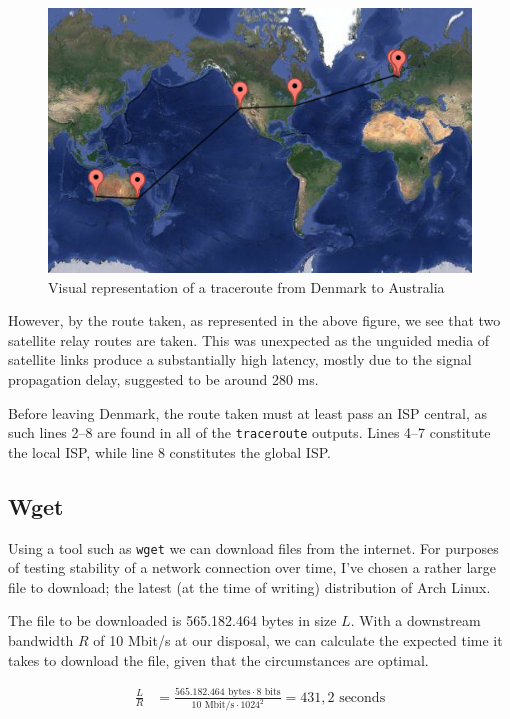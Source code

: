 \documentclass{acm_proc_article-sp}
\newcommand{\prog}[1]{{\tt #1}}
\begin{document}
\begin{figure}[H]
    \center
    \includegraphics[scale=0.47]{figures/traceroute_au.jpg}
    \caption{Visual representation of a traceroute from Denmark to Australia}
    \label{fig:traceroute-australia}
\end{figure}

However, by the route taken, as represented in the above figure, we see that
two satellite relay routes are taken. This was unexpected as the unguided
media of satellite links produce a substantially high latency, mostly due to
the signal propagation delay, suggested\cite[p. 21]{KR} to be around 280 ms.

Before leaving Denmark, the route taken must at least pass an ISP central, as
such lines 2--8 are found in all of the \prog{traceroute} outputs. Lines 4--7
constitute the local ISP, while line 8 constitutes the global ISP.

\subsection{Wget}
\label{sec:latency-and-bandwidth|sub:wget}
Using a tool such as \prog{wget} we can download files from the internet. For
purposes of testing stability of a network connection over time, I've chosen a
rather large file to download; the latest (at the time of writing)
distribution of Arch Linux.

The file to be downloaded is 565.182.464 bytes in size $L$. With a downstream
bandwidth $R$ of 10 Mbit/s at our disposal, we can calculate the expected time
it takes to download the file, given that the circumstances are optimal.

\begin{align}
    \frac{L}{R}
    &= \frac{565.182.464 \text{ bytes} \cdot 8 \text{ bits}}
            {10 \text{ Mbit/s} \cdot 1024^2}
     = 431,2 \text{ seconds}
\end{align}
\end{document}
